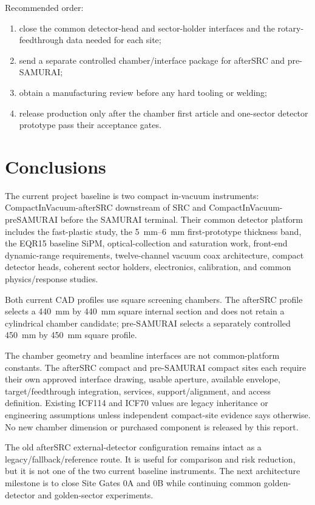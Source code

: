 \documentclass[10pt,letterpaper]{article}
\begin{document}
Recommended order:
\begin{enumerate}
  \item close the common detector-head and sector-holder interfaces and the
    rotary-feedthrough data needed
    for each site;
  \item send a separate controlled chamber/interface package for afterSRC and pre-SAMURAI;
  \item obtain a manufacturing review before any hard tooling or welding;
  \item release production only after the chamber first article and one-sector detector
    prototype pass their acceptance gates.
\end{enumerate}

\section{Conclusions}

The current project baseline is two compact in-vacuum instruments:
CompactInVacuum-afterSRC downstream of SRC and CompactInVacuum-preSAMURAI before the
SAMURAI terminal. Their common detector platform includes the fast-plastic study, the
\SIrange{5}{6}{\milli\meter} first-prototype thickness band, the EQR15 baseline SiPM,
optical-collection and saturation work, front-end dynamic-range requirements, twelve-channel
vacuum coax architecture, compact detector heads, coherent sector holders, electronics,
calibration, and common physics/response studies.

Both current CAD profiles use square screening chambers. The afterSRC profile selects a
\SI{440}{\milli\meter} by \SI{440}{\milli\meter} square internal section and does not retain
a cylindrical chamber candidate; pre-SAMURAI selects a separately controlled
\SI{450}{\milli\meter} by \SI{450}{\milli\meter} square profile.

The chamber geometry and beamline interfaces are not common-platform constants. The
afterSRC compact and pre-SAMURAI compact sites each require their own approved interface
drawing, usable aperture, available envelope, target/feedthrough integration, services,
support/alignment, and access definition. Existing ICF114 and ICF70 values are legacy
inheritance or engineering assumptions unless independent compact-site evidence says
otherwise. No new chamber dimension or purchased component is released by this report.

The old afterSRC external-detector configuration remains intact as a legacy/fallback/reference
route. It is useful for comparison and risk reduction, but it is not one of the two current
baseline instruments. The next architecture milestone is to close Site Gates 0A and 0B while
continuing common golden-detector and golden-sector experiments.
\end{document}
